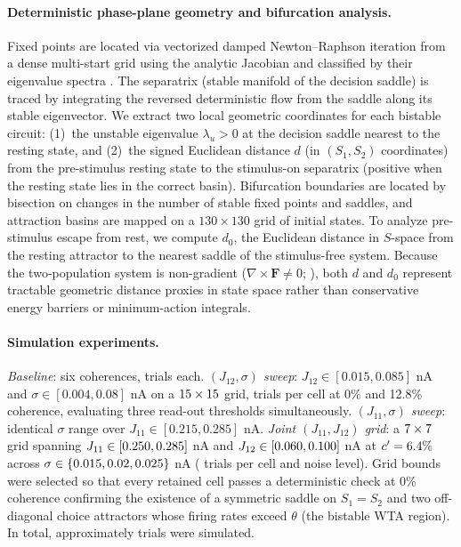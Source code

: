 \documentclass[11pt]{article}
\begin{document}
	\paragraph{Deterministic phase-plane geometry and bifurcation analysis.} Fixed points are located via vectorized damped Newton--Raphson iteration from a dense multi-start grid using the analytic Jacobian and classified by their eigenvalue spectra \citep{Strogatz2015}. The separatrix (stable manifold of the decision saddle) is traced by integrating the reversed deterministic flow from the saddle along its stable eigenvector. We extract two local geometric coordinates for each bistable circuit: (1)~the unstable eigenvalue $\lambda_u>0$ at the decision saddle nearest to the resting state, and (2)~the signed Euclidean distance $d$ (in $(S_1,S_2)$ coordinates) from the pre-stimulus resting state to the stimulus-on separatrix (positive when the resting state lies in the correct basin). Bifurcation boundaries are located by bisection on changes in the number of stable fixed points and saddles, and attraction basins are mapped on a $130\times130$ grid of initial states. To analyze pre-stimulus escape from rest, we compute $d_0$, the Euclidean distance in $S$-space from the resting attractor to the nearest saddle of the stimulus-free system. Because the two-population system is non-gradient ($\nabla\times\mathbf{F}\neq 0$; \citealp{YeLi2021}), both $d$ and $d_0$ represent tractable geometric distance proxies in state space rather than conservative energy barriers or minimum-action integrals.
	
	\paragraph{Simulation experiments.}
	\emph{Baseline}: six coherences, \nBase{} trials each.
	\emph{$(J_{12},\sigma)$ sweep}: $J_{12}\in[0.015,0.085]$ nA and $\sigma\in[0.004,0.08]$ nA on a $15\times15$ grid, \nSweep{} trials per cell at 0\% and 12.8\% coherence, evaluating three read-out thresholds simultaneously.
	\emph{$(J_{11},\sigma)$ sweep}: identical $\sigma$ range over $J_{11}\in[0.215,0.285]$ nA.
	\emph{Joint $(J_{11},J_{12})$ grid}: a $7\times7$ grid spanning $J_{11}\in[0.250,0.285]$ nA and $J_{12}\in[0.060,0.100]$ nA at $c'=6.4\%$ across $\sigma\in\{0.015, 0.02, 0.025\}$ nA (\dTrials{} trials per cell and noise level). Grid bounds were selected so that every retained cell passes a deterministic check at 0\% coherence confirming the existence of a symmetric saddle on $S_1=S_2$ and two off-diagonal choice attractors whose firing rates exceed $\theta$ (the bistable WTA region). In total, approximately \nTrialsTotal{} trials were simulated.
	
\end{document}
